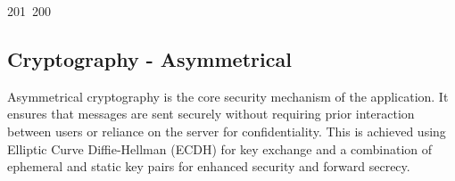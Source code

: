 201~200~\documentclass{article}
\begin{document}
	                                                                                                                                                                                                                                                                                                	                                                                                                                                        	    	                                                                                                	                                                                                                                                                                                                                                                                                                                                	                                                                        	                                                                        	                                                                                                                                        	                                                                                                                                \subsection{Cryptography - Asymmetrical}

	                                                                                                                                                                                                                                                                                                	                                                                                                                                        	    	                                                                                                	                                                                                                                                                                                                                                                                                                                                	                                                                        	                                                                        	                                                                                                                                        	                                                                                                                                Asymmetrical cryptography is the core security mechanism of the application. It ensures that messages are sent securely without requiring prior interaction between users or reliance on the server for confidentiality. This is achieved using Elliptic Curve Diffie-Hellman (ECDH) for key exchange and a combination of ephemeral and static key pairs for enhanced security and forward secrecy.
\end{document}
